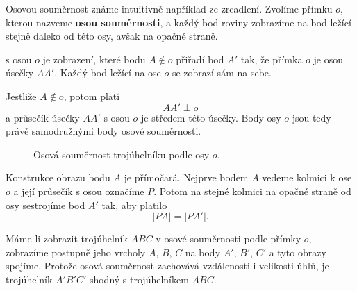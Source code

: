 \documentclass[12pt,a4paper]{article}
\begin{document}
Osovou souměrnost známe intuitivně například ze zrcadlení. Zvolíme přímku $o$, kterou nazveme \textbf{osou souměrnosti}, a každý bod roviny zobrazíme na bod ležící stejně daleko od této osy, avšak na opačné straně.

\begin{definitionbox}
     s osou $o$ je zobrazení, které bodu $A\notin o$ přiřadí bod $A'$ tak, že přímka $o$ je osou úsečky $AA'$. Každý bod ležící na ose $o$ se zobrazí sám na sebe.
\end{definitionbox}

Jestliže $A\notin o$, potom platí
\[
    AA'\perp o
\]
a průsečík úsečky $AA'$ s osou $o$ je středem této úsečky. Body osy $o$ jsou tedy právě samodružnými body osové souměrnosti.

\begin{figure}[ht]
    \centering
    \caption{Osová souměrnost trojúhelníku podle osy $o$.}
\end{figure}

Konstrukce obrazu bodu $A$ je přímočará. Nejprve bodem $A$ vedeme kolmici k ose $o$ a její průsečík s osou označíme $P$. Potom na stejné kolmici na opačné straně od osy sestrojíme bod $A'$ tak, aby platilo
\[
    |PA|=|PA'|.
\]

\begin{examplebox}
    Máme-li zobrazit trojúhelník $ABC$ v osové souměrnosti podle přímky $o$, zobrazíme postupně jeho vrcholy $A$, $B$, $C$ na body $A'$, $B'$, $C'$ a tyto obrazy spojíme. Protože osová souměrnost zachovává vzdálenosti i velikosti úhlů, je trojúhelník $A'B'C'$ shodný s trojúhelníkem $ABC$.
\end{examplebox}
\end{document}
